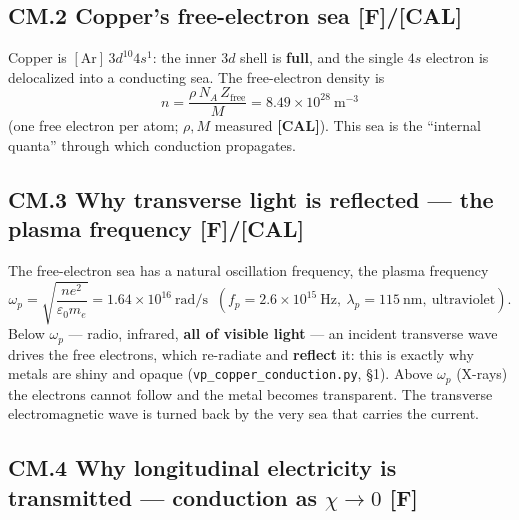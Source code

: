 \documentclass[
  10pt,
]{article}
\begin{document}
\hypertarget{cm.2-coppers-free-electron-sea-fcal}{%
\subsection{\texorpdfstring{CM.2 Copper's free-electron sea
\textbf{{[}F{]}/{[}CAL{]}}}{CM.2 Copper's free-electron sea {[}F{]}/{[}CAL{]}}}\label{cm.2-coppers-free-electron-sea-fcal}}

Copper is \([\mathrm{Ar}]\,3d^{10}4s^1\): the inner \(3d\) shell is
\textbf{full}, and the single \(4s\) electron is delocalized into a
conducting sea. The free-electron density is
\[ n = \frac{\rho\,N_A\,Z_{\text{free}}}{M} = 8.49\times 10^{28}\ \mathrm{m^{-3}} \]
(one free electron per atom; \(\rho, M\) measured \textbf{{[}CAL{]}}).
This sea is the ``internal quanta'' through which conduction propagates.

\hypertarget{cm.3-why-transverse-light-is-reflected-the-plasma-frequency-fcal}{%
\subsection{\texorpdfstring{CM.3 Why transverse light is reflected ---
the plasma frequency
\textbf{{[}F{]}/{[}CAL{]}}}{CM.3 Why transverse light is reflected --- the plasma frequency {[}F{]}/{[}CAL{]}}}\label{cm.3-why-transverse-light-is-reflected-the-plasma-frequency-fcal}}

The free-electron sea has a natural oscillation frequency, the plasma
frequency
\[ \omega_p = \sqrt{\frac{n e^2}{\varepsilon_0 m_e}} = 1.64\times 10^{16}\ \mathrm{rad/s}
   \;\;(f_p = 2.6\times 10^{15}\ \mathrm{Hz},\ \lambda_p = 115\ \mathrm{nm},\ \text{ultraviolet}). \]
Below \(\omega_p\) --- radio, infrared, \textbf{all of visible light}
--- an incident transverse wave drives the free electrons, which
re-radiate and \textbf{reflect} it: this is exactly why metals are shiny
and opaque (\texttt{vp\_copper\_conduction.py}, §1). Above \(\omega_p\)
(X-rays) the electrons cannot follow and the metal becomes transparent.
The transverse electromagnetic wave is turned back by the very sea that
carries the current.

\hypertarget{cm.4-why-longitudinal-electricity-is-transmitted-conduction-as-chi-to-0-f}{%
\subsection{\texorpdfstring{CM.4 Why longitudinal electricity is
transmitted --- conduction as \(\chi \to 0\)
\textbf{{[}F{]}}}{CM.4 Why longitudinal electricity is transmitted --- conduction as \textbackslash chi \textbackslash to 0 {[}F{]}}}\label{cm.4-why-longitudinal-electricity-is-transmitted-conduction-as-chi-to-0-f}}
\end{document}
